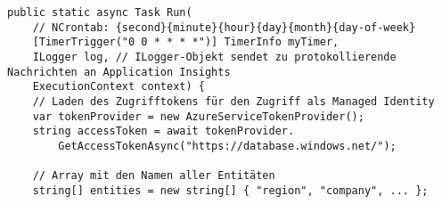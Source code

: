 \lstset{style=sharpc}
\begin{lstlisting}[caption=Quellcode für die Datenintegration mit Azure Functions,captionpos=b,label={lst:azFunc},escapeinside=``]
public static async Task Run(
    // NCrontab: {second}{minute}{hour}{day}{month}{day-of-week}
    [TimerTrigger("0 0 * * * *")] TimerInfo myTimer,
    ILogger log, // ILogger-Objekt sendet zu protokollierende Nachrichten an Application Insights
    ExecutionContext context) {
    // Laden des Zugrifftokens für den Zugriff als Managed Identity
    var tokenProvider = new AzureServiceTokenProvider();
    string accessToken = await tokenProvider.
        GetAccessTokenAsync("https://database.windows.net/");

    // Array mit den Namen aller Entitäten 
    string[] entities = new string[] { "region", "company", ... };
    

\end{lstlisting}

